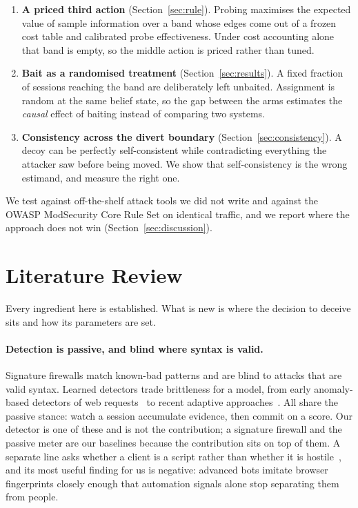 \documentclass[runningheads]{llncs}
\begin{document}
\begin{enumerate}
\item \textbf{A priced third action} (Section~\ref{sec:rule}). Probing maximises the
expected value of sample information over a band whose edges come out of a frozen
cost table and calibrated probe effectiveness. Under cost accounting alone that band
is empty, so the middle action is priced rather than tuned.

\item \textbf{Bait as a randomised treatment} (Section~\ref{sec:results}). A fixed
fraction of sessions reaching the band are deliberately left unbaited. Assignment is
random at the same belief state, so the gap between the arms estimates the
\emph{causal} effect of baiting instead of comparing two systems.

\item \textbf{Consistency across the divert boundary}
(Section~\ref{sec:consistency}). A decoy can be perfectly self-consistent while
contradicting everything the attacker saw before being moved. We show that
self-consistency is the wrong estimand, and measure the right one.
\end{enumerate}

We test against off-the-shelf attack tools we did not write and against the OWASP
ModSecurity Core Rule Set on identical traffic, and we report where the approach
does not win (Section~\ref{sec:discussion}).

\section{Literature Review}
\label{sec:related}

Every ingredient here is established. What is new is where the decision to deceive
sits and how its parameters are set.

\paragraph{Detection is passive, and blind where syntax is valid.}
Signature firewalls match known-bad patterns and are blind to attacks that are valid
syntax. Learned detectors trade brittleness for a model, from early anomaly-based
detectors of web requests~\cite{kruegel2003anomaly} to recent adaptive
approaches~\cite{amouei2022rat}. All share the passive stance: watch a session
accumulate evidence, then commit on a score. Our detector is one of these and is not
the contribution; a signature firewall and the passive meter are our baselines
because the contribution sits on top of them. A separate line asks whether a client
is a script rather than whether it is hostile~\cite{iliou2019towards}, and its most
useful finding for us is negative: advanced bots imitate browser fingerprints closely
enough that automation signals alone stop separating them from people.
\end{document}
